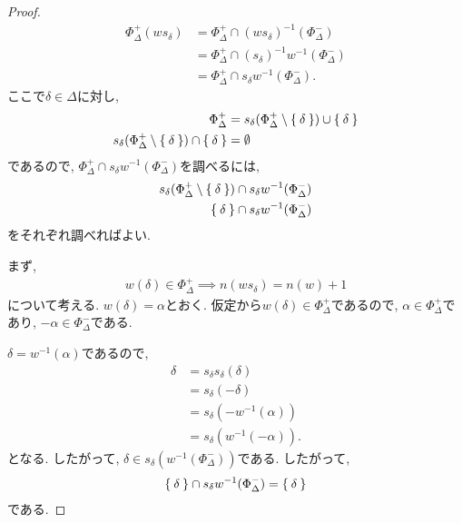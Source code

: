 \begin{proof}
  \begin{align*}
    \Phi_\Delta^{+}(ws_\delta)
    &=\Phi_\Delta^+\cap(ws_\delta)^{-1}(\Phi_\Delta^-)\\
    &=\Phi_\Delta^+\cap(s_\delta)^{-1} w^{-1}(\Phi_\Delta^-)\\
    &=\Phi_\Delta^+\cap s_\delta w^{-1}(\Phi_\Delta^-).
  \end{align*}
  ここで$\delta\in\Delta$に対し,
  \begin{align*}
    \Phi_\Delta^+&=s_\delta(\Phi_\Delta^+\setminus \Set{\delta}) \cup\Set{\delta}\\
    s_\delta(\Phi_\Delta^+\setminus \Set{\delta})\cap \Set{\delta}&=\emptyset
  \end{align*}
  であるので, $\Phi_\Delta^+\cap s_\delta w^{-1}(\Phi_\Delta^-)$を調べるには,
  \begin{align*}
    s_\delta(\Phi_\Delta^+\setminus \Set{\delta}) \cap s_\delta w^{-1}(\Phi_\Delta^-)\\
    \Set{\delta} \cap s_\delta w^{-1}(\Phi_\Delta^-)
  \end{align*}
  をそれぞれ調べればよい.

  まず,
  \begin{align*}
    w(\delta)\in\Phi_\Delta^+ \implies n(ws_\delta)=n(w)+1
  \end{align*}
  について考える.
  $w(\delta)=\alpha$とおく.
  仮定から$w(\delta)\in\Phi_\Delta^+$であるので,
  $\alpha\in\Phi_\Delta^+$であり,
  $-\alpha\in\Phi_\Delta^-$である.
  
  $\delta=w^{-1}(\alpha)$であるので,
  \begin{align*}
    \delta
    &=s_\delta s_\delta(\delta)\\
    &=s_\delta (-\delta)\\
    &=s_\delta(- w^{-1}(\alpha))\\
    &=s_\delta(w^{-1}(-\alpha)).
  \end{align*}
  となる. したがって,
  $\delta\in s_\delta(w^{-1}(\Phi_\Delta^-))$である.
  したがって,
  \begin{align*}
    \Set{\delta} \cap s_\delta w^{-1}(\Phi_\Delta^-) = \Set{\delta}
  \end{align*}
  である.
  


\end{proof}
